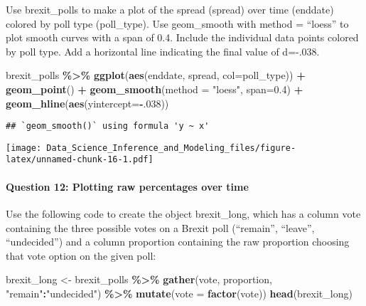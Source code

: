 \documentclass[
]{article}
\newenvironment{Shaded}{\begin{snugshade}}{\end{snugshade}}
\newcommand{\DataTypeTok}[1]{\textcolor[rgb]{0.13,0.29,0.53}{#1}}
\newcommand{\DecValTok}[1]{\textcolor[rgb]{0.00,0.00,0.81}{#1}}
\newcommand{\FloatTok}[1]{\textcolor[rgb]{0.00,0.00,0.81}{#1}}
\newcommand{\KeywordTok}[1]{\textcolor[rgb]{0.13,0.29,0.53}{\textbf{#1}}}
\newcommand{\NormalTok}[1]{#1}
\newcommand{\OperatorTok}[1]{\textcolor[rgb]{0.81,0.36,0.00}{\textbf{#1}}}
\newcommand{\StringTok}[1]{\textcolor[rgb]{0.31,0.60,0.02}{#1}}
\begin{document}
Use brexit\_polls to make a plot of the spread (spread) over time
(enddate) colored by poll type (poll\_type). Use geom\_smooth with
method = ``loess'' to plot smooth curves with a span of 0.4. Include the
individual data points colored by poll type. Add a horizontal line
indicating the final value of d=-.038.

\begin{Shaded}
\begin{Highlighting}[]
\NormalTok{brexit\_polls }\OperatorTok{\%\textgreater{}\%}
\StringTok{  }\KeywordTok{ggplot}\NormalTok{(}\KeywordTok{aes}\NormalTok{(enddate, spread, }\DataTypeTok{col=}\NormalTok{poll\_type)) }\OperatorTok{+}
\StringTok{  }\KeywordTok{geom\_point}\NormalTok{() }\OperatorTok{+}
\StringTok{  }\KeywordTok{geom\_smooth}\NormalTok{(}\DataTypeTok{method =} \StringTok{"loess"}\NormalTok{, }\DataTypeTok{span=}\FloatTok{0.4}\NormalTok{) }\OperatorTok{+}
\StringTok{  }\KeywordTok{geom\_hline}\NormalTok{(}\KeywordTok{aes}\NormalTok{(}\DataTypeTok{yintercept=}\OperatorTok{{-}}\NormalTok{.}\DecValTok{038}\NormalTok{))}
\end{Highlighting}
\end{Shaded}

\begin{verbatim}
## `geom_smooth()` using formula 'y ~ x'
\end{verbatim}

\texttt{[image: Data\_Science\_Inference\_and\_Modeling\_files/figure-latex/unnamed-chunk-16-1.pdf]}

\hypertarget{question-12-plotting-raw-percentages-over-time}{%
\paragraph{Question 12: Plotting raw percentages over
time}\label{question-12-plotting-raw-percentages-over-time}}

Use the following code to create the object brexit\_long, which has a
column vote containing the three possible votes on a Brexit poll
(``remain'', ``leave'', ``undecided'') and a column proportion
containing the raw proportion choosing that vote option on the given
poll:

\begin{Shaded}
\begin{Highlighting}[]
\NormalTok{brexit\_long \textless{}{-}}\StringTok{ }\NormalTok{brexit\_polls }\OperatorTok{\%\textgreater{}\%}
\StringTok{    }\KeywordTok{gather}\NormalTok{(vote, proportion, }\StringTok{"remain"}\OperatorTok{:}\StringTok{"undecided"}\NormalTok{) }\OperatorTok{\%\textgreater{}\%}
\StringTok{    }\KeywordTok{mutate}\NormalTok{(}\DataTypeTok{vote =} \KeywordTok{factor}\NormalTok{(vote))}
\KeywordTok{head}\NormalTok{(brexit\_long)}
\end{Highlighting}
\end{Shaded}
\end{document}
